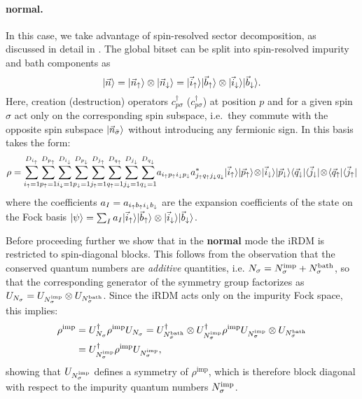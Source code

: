 \documentclass[edipack_sp.tex]{subfiles}
\begin{document}
\paragraph{{\bf normal}.}
In this case, we take advantage of spin-resolved sector decomposition, 
as discussed in detail in 
. 
The global bitset can be split into spin-resolved 
impurity and bath components as
\begin{equation}
|\vec{n}\rangle =
|\vec{n}_\uparrow\rangle\otimes |\vec{n}_\downarrow\rangle =
|\vec{i}_\uparrow\rangle|\vec{b}_\uparrow\rangle\otimes |\vec{i}_\downarrow\rangle|\vec{b}_\downarrow\rangle.
\label{eq:decomposition_for_rdm_normal}
\end{equation}
Here, creation (destruction) operators  $c^\dagger_{p\sigma}$
($c^\dagger_{p\sigma}$) at position $p$ and for a given spin $\sigma$
act only on the corresponding 
spin subspace, i.e.~they commute with the opposite spin 
subspace $|\vec{n}_{\bar{\sigma}}\rangle$ without introducing any 
fermionic sign. In this basis  takes the form:
\begin{equation}\label{RhoNormal}
\rho = 
    \sum_{i_\up=1}^{D_{i_\up}}\!
    \sum_{p_\up=1}^{D_{p_\up}}\!
    \sum_{i_\dw=1}^{D_{i_\dw}}\!
    \sum_{p_\dw=1}^{D_{p_\dw}}\!
    \sum_{j_\up=1}^{D_{j_\up}}\!
    \sum_{q_\up=1}^{D_{q_\up}}\!
    \sum_{j_\dw=1}^{D_{j_\dw}}\!
    \sum_{q_\dw=1}^{D_{q_\dw}}\!
    a_{i_\up p_\up i_\dw p_\dw}a^*_{j_\up q_\up j_\dw q_\dw}
    \ket{\vec{i}_\up}\ket{\vec{p}_\up}\!\otimes\!\ket{\vec{i}_\dw}\ket{\vec{p}_\dw}
    \bra{\vec{q}_\dw}\bra{\vec{j}_\dw}\!\otimes\!\bra{\vec{q}_\up}\bra{\vec{j}_\up}
\end{equation}
where the coefficients $a_I = a_{i_\uparrow b_\uparrow i_\downarrow b_\downarrow}$ are the
expansion coefficients of the state on the Fock basis
$|\psi\rangle = \sum_I a_I |\vec{i}_\uparrow\rangle|\vec{b}_\uparrow\rangle\otimes |\vec{i}_\downarrow\rangle|\vec{b}_\downarrow\rangle$.
  
Before proceeding further we show that in the {\bf normal} mode the iRDM is restricted to 
{spin-diagonal} blocks. This follows from the observation 
that the conserved quantum numbers are 
{\it additive} quantities, i.e. 
$N_\sigma = N_\sigma^\mathrm{imp} + N_\sigma^\mathrm{bath}$,
so that the corresponding generator of the symmetry group factorizes as
$U_{N_\sigma} = U_{N_\sigma^\mathrm{imp}} \otimes U_{N_\sigma^\mathrm{bath}}$. 
Since the iRDM acts only on the impurity Fock space, this implies:
\begin{equation}
\begin{aligned}
\rho^\mathrm{imp} &= U_{N_\sigma}^\dagger \rho^\mathrm{imp} U_{N_\sigma} = 
U_{N_\sigma^\mathrm{bath}}^\dagger \otimes U_{N_\sigma^\mathrm{imp}}^\dagger 
\rho^\mathrm{imp} 
U_{N_\sigma^\mathrm{imp}} \otimes U_{N_\sigma^\mathrm{bath}} \\
&= 
U_{N_\sigma^\mathrm{imp}}^\dagger \rho^\mathrm{imp} U_{N_\sigma^\mathrm{imp}},
\end{aligned}
\end{equation}
showing that $U_{N_\sigma^\mathrm{imp}}$ defines a symmetry of 
$\rho^\mathrm{imp}$, which is therefore block diagonal with respect to 
the impurity quantum numbers $N_\sigma^\mathrm{imp}$.
\end{document}

